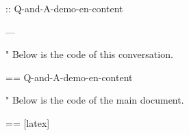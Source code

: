 \documentclass[%
  numbered question,
  numbered answer,
  scroll,
]{Q-and-A}
\begin{document}
:: {Q-and-A-demo-en-content}


---

"
  Below is the code of this conversation.

  == {Q-and-A-demo-en-content}

"
  Below is the code of the main document.

  == [latex] {\jobname}
\end{document}
